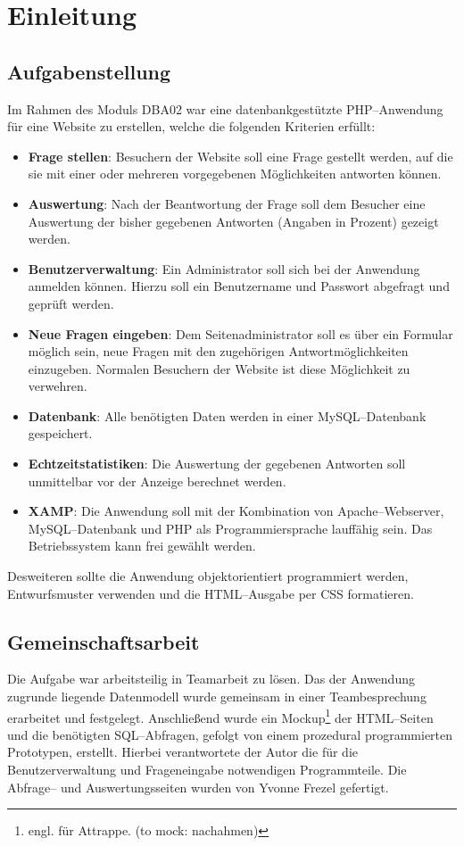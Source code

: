 \section{Einleitung}
\subsection{Aufgabenstellung}

Im Rahmen des Moduls DBA02 war eine datenbankgestützte PHP--Anwendung für eine Website zu erstellen, welche die folgenden Kriterien erfüllt:

\begin{itemize}
\item \textbf{Frage stellen}: Besuchern der Website soll eine Frage gestellt werden, auf die sie mit einer oder mehreren vorgegebenen Möglichkeiten antworten können.
\item \textbf{Auswertung}: Nach der Beantwortung der Frage soll dem Besucher eine Auswertung der bisher gegebenen Antworten (Angaben in Prozent) gezeigt werden.
\item \textbf{Benutzerverwaltung}: Ein Administrator soll sich bei der Anwendung anmelden können. Hierzu soll ein Benutzername und Passwort abgefragt und geprüft werden.
\item \textbf{Neue Fragen eingeben}: Dem Seitenadministrator soll es über ein Formular möglich sein, neue Fragen mit den zugehörigen Antwortmöglichkeiten einzugeben. Normalen Besuchern der Website ist diese Möglichkeit zu verwehren.  
\item \textbf{Datenbank}: Alle benötigten Daten werden in einer MySQL--Datenbank gespeichert.
\item \textbf{Echtzeitstatistiken}: Die Auswertung der gegebenen Antworten soll unmittelbar vor der Anzeige berechnet werden.
\item \textbf{XAMP}: Die Anwendung soll mit der Kombination von Apache--Webserver, MySQL--Datenbank und PHP als Programmiersprache lauffähig sein. Das Betriebssystem kann frei gewählt werden. 
\end{itemize}

Desweiteren sollte die Anwendung objektorientiert programmiert werden, Entwurfsmuster verwenden und die HTML--Ausgabe per CSS formatieren.

\subsection{Gemeinschaftsarbeit}

Die Aufgabe war arbeitsteilig in Teamarbeit zu lösen. Das der Anwendung zugrunde liegende Datenmodell wurde gemeinsam in einer Teambesprechung er\-arbeitet und festgelegt. Anschließend wurde ein Mockup\footnote{engl. für Attrappe. (to mock: nachahmen)} der HTML--Seiten und die benötigten SQL--Abfragen, gefolgt von einem prozedural programmierten Prototypen, erstellt. Hierbei verantwortete der Autor die für die Benutzerverwaltung und Frageneingabe notwendigen Programmteile. Die Abfrage-- und Auswertungsseiten wurden von Yvonne Frezel gefertigt.

